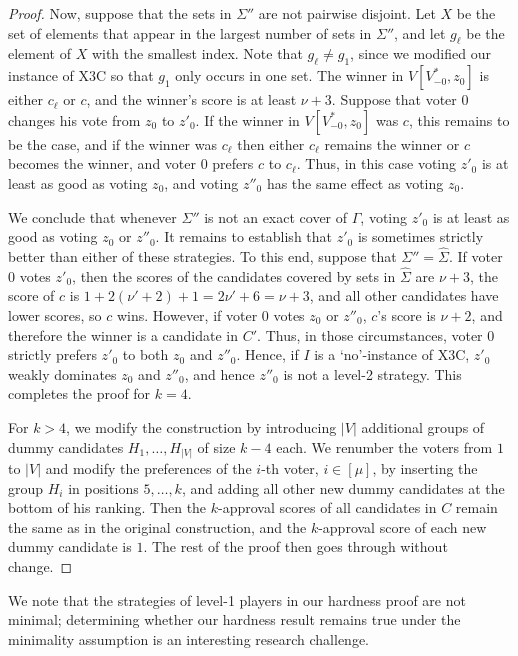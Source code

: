 \documentclass[11pt]{article}
\begin{document}
\begin{proof}
Now, suppose that the sets in $\Sigma''$ are not pairwise disjoint. 
Let $X$ be the set of elements that appear in the largest
number of sets in $\Sigma''$, and let $g_\ell$ be the element of $X$
with the smallest index. Note that $g_\ell\neq g_1$, since we modified our instance of X3C so that 
$g_1$ only occurs in one set.
The winner in $V[V^*_{-0}, z_0]$ is either $c_\ell$ or $c$, and the winner's score is at least $\nu+3$.
Suppose that voter $0$ changes his vote from $z_0$ to $z'_0$.
If the winner in $V[V^*_{-0}, z_0]$ was $c$, this remains to be the case, 
and if the winner was $c_\ell$ then either $c_\ell$ remains the winner or $c$ becomes the winner, 
and voter $0$ prefers $c$ to $c_\ell$. Thus, in this case voting $z'_0$
is at least as good as voting $z_0$, and voting $z''_0$ has the same effect as voting $z_0$.

We conclude that whenever $\Sigma''$ is not an exact cover of $\Gamma$, voting $z'_0$ is at least
as good as voting $z_0$ or $z''_0$. 
It remains to establish that $z'_0$ is sometimes strictly better than either of these strategies.
To this end, suppose that $\Sigma''=\widehat{\Sigma}$. 
If voter $0$ votes $z'_0$, then the scores of the candidates covered by sets in $\widehat{\Sigma}$
are $\nu+3$, the score of $c$ is $1+2(\nu'+2) +1 =2\nu'+6=\nu+3$, and all other candidates have lower scores, so $c$ wins.
However, if voter $0$ votes $z_0$ or $z''_0$, $c$'s score is $\nu+2$, and therefore the winner is a candidate in $C'$.
Thus, in those circumstances, voter $0$ strictly prefers $z'_0$ to both $z_0$ and $z''_0$.
Hence, if $I$ is a `no'-instance of X3C, $z'_0$ weakly dominates $z_0$ and $z''_0$, 
and hence $z''_0$ is not a level-2 strategy.
This completes the proof for $k=4$. 

For $k>4$, we modify the construction by introducing $|V|$ additional groups of dummy candidates
$H_1, \dots, H_{|V|}$ of size $k-4$ each. We renumber the voters from $1$ to $|V|$ and modify 
the preferences of the $i$-th voter, $i\in [\mu]$, by inserting the 
group $H_i$ in positions $5, \dots, k$, and adding all other new dummy candidates
at the bottom of his ranking. Then the $k$-approval scores of all candidates in $C$
remain the same as in the original construction, and the $k$-approval score of each new dummy candidate
is $1$. The rest of the proof then goes through without change. 
\end{proof}

We note that the strategies of level-1 players in our hardness proof are not minimal;
determining whether our hardness result remains true under the minimality assumption 
is an interesting research challenge.
\end{document}
